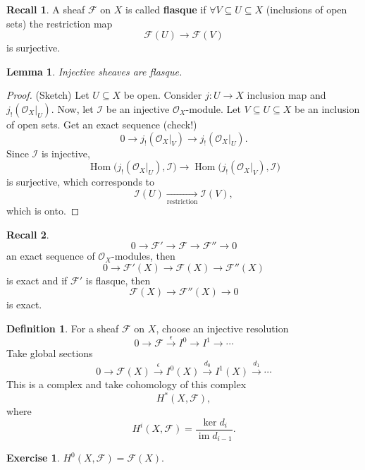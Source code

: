 \documentclass[12pt]{article}
\DeclareMathOperator{\im}{im}
\DeclareMathOperator{\Hom}{Hom}
\newtheorem*{lemma}{Lemma}
\theoremstyle{definition}
\newtheorem*{definition}{Definition}
\newtheorem*{recall}{Recall}
\newtheorem*{exercise}{Exercise}
\theoremstyle{remark}
\begin{document}
\begin{recall}
A sheaf $\mathcal{F}$ on $X$ is called \textbf{flasque} if $\forall V\subseteq U\subseteq X$ (inclusions of open sets) the restriction map
\[\mathcal{F}(U)\longrightarrow\mathcal{F}(V)\]
is surjective.
\end{recall}

\begin{lemma}
Injective sheaves are flasque.
\end{lemma}

\begin{proof}
(Sketch) Let $U\subseteq X$ be open. Consider $j:U\rightarrow X$ inclusion map and $j_!(\mathcal{O}_X|_U)$. Now, let $\mathcal{I}$ be an injective $\mathcal{O}_X$-module. Let $V\subseteq U\subseteq X$ be an inclusion of open sets. Get an exact sequence (check!)
\[0\longrightarrow j_!(\mathcal{O}_X|_V)\longrightarrow j_!(\mathcal{O}_X|_U).\]
Since $\mathcal{I}$ is injective,
\[\Hom\big(j_!(\mathcal{O}_X|_U),\mathcal{I}\big)\longrightarrow\Hom\big(j_!(\mathcal{O}_X|_V),\mathcal{I}\big)\]
is surjective, which corresponds to
\[\mathcal{I}(U)\xrightarrow[\text{restriction}]{}\mathcal{I}(V),\]
which is onto.
\end{proof}

\begin{recall}
\[0\longrightarrow\mathcal{F}'\longrightarrow\mathcal{F}\longrightarrow\mathcal{F}''\longrightarrow0\]
an exact sequence of $\mathcal{O}_X$-modules, then
\[0\longrightarrow\mathcal{F}'(X)\longrightarrow\mathcal{F}(X)\longrightarrow\mathcal{F}''(X)\]
is exact and if $\mathcal{F}'$ is flasque, then
\[\mathcal{F}(X)\longrightarrow\mathcal{F}''(X)\longrightarrow0\]
is exact.
\end{recall}

\begin{definition}
For a sheaf $\mathcal{F}$ on $X$, choose an injective resolution
\[0\longrightarrow\mathcal{F}\overset{\epsilon}{\longrightarrow}I^0\longrightarrow I^1\longrightarrow\cdots\]
Take global sections
\[0\longrightarrow\mathcal{F}(X)\overset{\epsilon}{\longrightarrow}I^0(X)\overset{d_0}{\longrightarrow}I^1(X)\overset{d_1}{\longrightarrow}\cdots\]
This is a complex and take cohomology of this complex
\[H^*(X,\mathcal{F}),\]
where
\[H^i(X,\mathcal{F})=\frac{\ker d_i}{\im d_{i-1}}.\]
\end{definition}

\begin{exercise}
$H^0(X,\mathcal{F})=\mathcal{F}(X)$.
\end{exercise}
\end{document}
